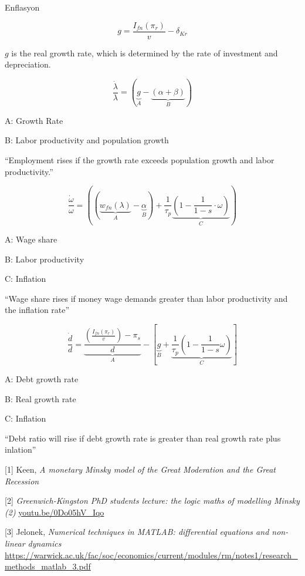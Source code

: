\documentclass[12pt,fleqn]{article}\usepackage{../../common}
\begin{document}
Enflasyon


$$ g = \frac{I_{fn}(\pi_r)}{v} - \delta_{Kr} $$

$g$ is the real growth rate, which is determined by the rate of investment
and depreciation.




$$ 
\frac{\dot{\lambda}}{\lambda} =
\left( 
  \underbrace{ g }_{A} - 
  \underbrace{ (\alpha + \beta) }_{B}
\right)
$$

A: Growth Rate

B: Labor productivity and population growth

``Employment rises if the growth rate exceeds population growth and labor productivity.''


$$ 
\frac{\dot{\omega}}{\omega} = 
\left( 
(\underbrace{w_{fn}(\lambda)}_{A} - \underbrace{\alpha}_{B}) + \frac{1}{\tau_p}
\underbrace{\left( 1-\frac{1}{1-s} \cdot \omega \right)}_{C}
\right)
$$

A: Wage share 

B: Labor productivity

C: Inflation

``Wage share rises if money wage demands greater than labor productivity and
the inflation rate''



$$ 
\frac{\dot{d}}{d} = 
\underbrace{\frac{\left( \frac{I_{fn}(\pi_r)}{v} \right) - \pi_s }{d}}_{A} - 
\left[ 
\underbrace{g }_{B}+ 
\underbrace{\frac{1}{\tau_p} \left(1 - \frac{1}{1-s} \omega\right)}_{C}
\right]
$$

A: Debt growth rate

B: Real growth rate

C: Inflation

``Debt ratio will rise if debt growth rate is greater than real growth rate plus inlation''








[1] Keen, {\em A monetary Minsky model of the Great Moderation and the Great Recession}

[2] {\em Greenwich-Kingston PhD students lecture: the logic  maths of modelling Minsky (2)} \url{youtu.be/0Do05hV_Iqo}

[3] Jelonek, {\em Numerical techniques in MATLAB: differential equations and non-linear dynamics} \url{https://warwick.ac.uk/fac/soc/economics/current/modules/rm/notes1/research_methods_matlab_3.pdf}
\end{document}
